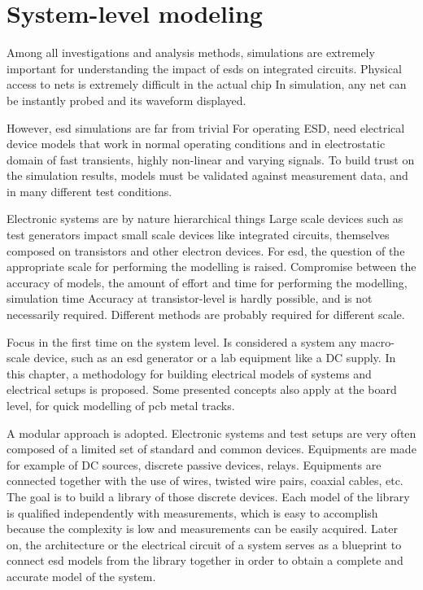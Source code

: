 \section{System-level modeling}
\label{sec:esd-modeling}

Among all investigations and analysis methods, simulations are extremely important for understanding the impact of \gls{esd}s on integrated circuits.
Physical access to nets is extremely difficult in the actual chip
In simulation, any net can be instantly probed and its waveform displayed.

However, \gls{esd} simulations are far from trivial
For operating ESD, need electrical device models that work in normal operating conditions and in electrostatic domain of fast transients, highly non-linear and varying signals.
To build trust on the simulation results, models must be validated against measurement data, and in many different test conditions.

Electronic systems are by nature hierarchical things
Large scale devices such as test generators impact small scale devices like integrated circuits, themselves composed on transistors and other electron devices.
For \gls{esd}, the question of the appropriate scale for performing the modelling is raised.
Compromise between the accuracy of models, the amount of effort and time for performing the modelling, simulation time
Accuracy at transistor-level is hardly possible, and is not necessarily required.
Different methods are probably required for different scale.

Focus in the first time on the system level.
Is considered a system any macro-scale device, such as an \gls{esd} generator or a lab equipment like a DC supply.
In this chapter, a methodology for building electrical models of systems and electrical setups is proposed.
Some presented concepts also apply at the board level, for quick modelling of \gls{pcb} metal tracks.

A modular approach is adopted.
Electronic systems and test setups are very often composed of a limited set of standard and common devices.
Equipments are made for example of DC sources, discrete passive devices, relays.
Equipments are connected together with the use of wires, twisted wire pairs, coaxial cables, etc.
The goal is to build a library of those discrete devices.
Each model of the library is qualified independently with measurements, which is easy to accomplish because the complexity is low and measurements can be easily acquired.
Later on, the architecture or the electrical circuit of a system serves as a blueprint to connect \gls{esd} models from the library together in order to obtain a complete and accurate model of the system.

